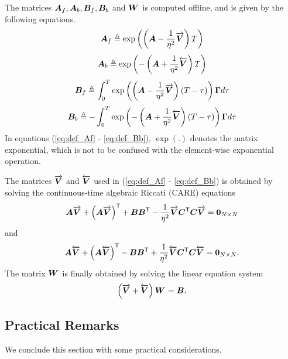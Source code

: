 The matrices $\bm{A}_f, \bm{A}_b, \bm{B}_f, \bm{B}_b$ and $\bm{W}^\mathsf{}$ is computed offline, and is given by the following equations.
\begin{equation}
    \label{eq:def_Af}
    \bm{A}_f \triangleq \exp \left( \left( \bm{A} - \frac{1}{\eta^2} \overrightarrow{\bm{V}} \right) T \right)
\end{equation}
\begin{equation}
    \label{eq:def_Ab}
    \bm{A}_b \triangleq \exp \left( - \left( \bm{A} + \frac{1}{\eta^2} \overleftarrow{\bm{V}} \right) T \right)
\end{equation}
\begin{equation}
    \label{eq:def_Bf}
    \bm{B}_f \triangleq \int_0^T \exp \left( \left( \bm{A} - \frac{1}{\eta^2} \overrightarrow{\bm{V}} \right) (T-\tau) \right)\bm{\Gamma} d\tau
\end{equation}
\begin{equation}
    \label{eq:def_Bb}
    \bm{B}_b \triangleq -\int_0^T \exp \left( - \left( \bm{A} + \frac{1}{\eta^2} \overleftarrow{\bm{V}} \right) (T-\tau) \right)\bm{\Gamma} d\tau
\end{equation}
In equations (\ref{eq:def_Af} - \ref{eq:def_Bb}), $\exp(.)$ denotes the matrix exponential, which is not to be confused with the element-wise exponential operation.

The matrices $\overrightarrow{\bm{V}}$ and $\overleftarrow{\bm{V}}$ used in (\ref{eq:def_Af} - \ref{eq:def_Bb}) is obtained by solving the continuous-time algebraic Riccati (CARE) equations
\begin{equation}
    \label{eq:Vf_care}
    \bm{A}\overrightarrow{\bm{V}} + \left( \bm{A}\overrightarrow{\bm{V}} \right)^\mathsf{T} + \bm{B} \bm{B}^\mathsf{T} - \frac{1}{\eta^2}\overrightarrow{\bm{V}}\bm{C}^\mathsf{T}\bm{C}\overrightarrow{\bm{V}} = \bm{0}_{N \times N}
\end{equation}
and
\begin{equation}
    \label{eq:Vb_care}
    \bm{A}\overleftarrow{\bm{V}} + \left( \bm{A}\overleftarrow{\bm{V}} \right)^\mathsf{T} - \bm{B} \bm{B}^\mathsf{T} + \frac{1}{\eta^2}\overleftarrow{\bm{V}}\bm{C}^\mathsf{T}\bm{C}\overleftarrow{\bm{V}} = \bm{0}_{N \times N}.
\end{equation}
The matrix $\bm{W}^\mathsf{}$ is finally obtained by solving the linear equation system
\begin{equation}
    \label{eq:W_sys}
    \left( \overrightarrow{\bm{V}} + \overleftarrow{\bm{V}} \right)\bm{W}^\mathsf{} = \bm{B}.
\end{equation}




\subsection{Practical Remarks}
We conclude this section with some practical considerations.

